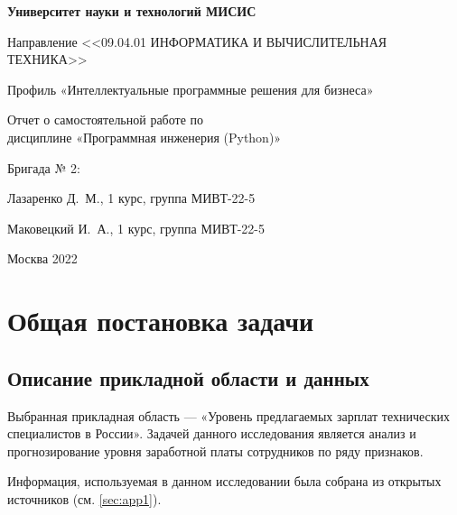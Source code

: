 \documentclass[12pt]{article}
\begin{document}
\pagestyle{empty}
\begin{center} \textbf{Университет науки и технологий МИСИС}

  Направление <<09.04.01 ИНФОРМАТИКА И ВЫЧИСЛИТЕЛЬНАЯ ТЕХНИКА>>

  Профиль «Интеллектуальные программные решения для бизнеса»

  \vspace{1.0cm}
  Отчет о самостоятельной работе по \\ дисциплине «Программная инженерия (Python)»

\end{center}

\vspace{10.0cm}
\begin{flushright}
{Бригада № 2}:

Лазаренко Д.~М., 1 курс, группа МИВТ-22-5

Маковецкий И.~А., 1 курс, группа МИВТ-22-5

\end{flushright}

\vspace*{\fill}

\begin{center}
Москва 2022
\end{center}

\newpage
\pagestyle{plain}
\renewcommand{\contentsname}{Оглавление}
\tableofcontents
\newpage

\section{Общая постановка задачи}

\subsection{Описание прикладной области и данных}
Выбранная прикладная область ---  «Уровень предлагаемых зарплат технических специалистов в России». Задачей данного исследования является анализ и прогнозирование уровня заработной платы сотрудников по ряду признаков.

Информация, используемая в данном исследовании была собрана из открытых источников (см. \ref{sec:app1}).
\end{document}
